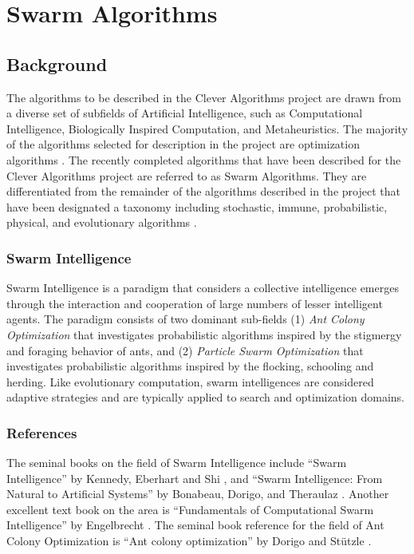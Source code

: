 \documentclass[a4paper, 11pt]{article}
\begin{document}
\section{Swarm Algorithms}
\label{sec:algorithms}

% 
% 
\subsection{Background}
The algorithms to be described in the Clever Algorithms project are drawn from a diverse set of subfields of Artificial Intelligence, such as Computational Intelligence, Biologically Inspired Computation, and Metaheuristics. The majority of the algorithms selected for description in the project are optimization algorithms \cite{Brownlee2010b}. 
The recently completed algorithms that have been described for the Clever Algorithms project are referred to as Swarm Algorithms. They are differentiated from the remainder of the algorithms described in the project that have been designated a taxonomy including stochastic, immune, probabilistic, physical, and evolutionary algorithms \cite{Brownlee2010b}. 

\subsubsection{Swarm Intelligence}
Swarm Intelligence is a paradigm that considers a collective intelligence emerges through the interaction and cooperation of large numbers of lesser intelligent agents. The paradigm consists of two dominant sub-fields (1) \emph{Ant Colony Optimization} that investigates probabilistic algorithms inspired by the stigmergy and foraging behavior of ants, and (2) \emph{Particle Swarm Optimization} that investigates probabilistic algorithms inspired by the flocking, schooling and herding. Like evolutionary computation, swarm intelligences are considered adaptive strategies and are typically applied to search and optimization domains.



\subsubsection{References}
The seminal books on the field of Swarm Intelligence include ``Swarm Intelligence'' by Kennedy, Eberhart and Shi \cite{Kennedy2001}, and ``Swarm Intelligence: From Natural to Artificial Systems'' by Bonabeau, Dorigo, and Theraulaz \cite{Bonabeau1999}. Another excellent text book on the area is ``Fundamentals of Computational Swarm Intelligence'' by Engelbrecht \cite{Engelbrecht2006}. The seminal book reference for the field of Ant Colony Optimization is ``Ant colony optimization'' by Dorigo and St\"utzle \cite{Dorigo2004}.
\end{document}
